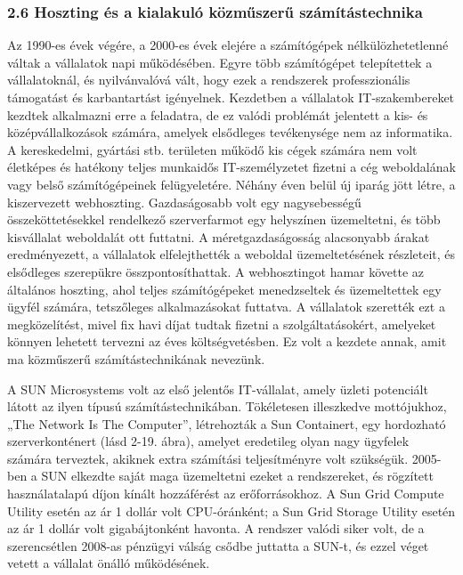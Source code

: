 \documentclass[
]{article}
\begin{document}
\hypertarget{hoszting-uxe9s-a-kialakuluxf3-kuxf6zmux171szerux171-szuxe1muxedtuxe1stechnika}{%
\subsubsection{2.6 Hoszting és a kialakuló közműszerű
számítástechnika}\label{hoszting-uxe9s-a-kialakuluxf3-kuxf6zmux171szerux171-szuxe1muxedtuxe1stechnika}}

Az 1990-es évek végére, a 2000-es évek elejére a számítógépek
nélkülözhetetlenné váltak a vállalatok napi működésében. Egyre több
számítógépet telepítettek a vállalatoknál, és nyilvánvalóvá vált, hogy
ezek a rendszerek professzionális támogatást és karbantartást
igényelnek. Kezdetben a vállalatok IT-szakembereket kezdtek alkalmazni
erre a feladatra, de ez valódi problémát jelentett a kis- és
középvállalkozások számára, amelyek elsődleges tevékenysége nem az
informatika. A kereskedelmi, gyártási stb. területen működő kis cégek
számára nem volt életképes és hatékony teljes munkaidős IT-személyzetet
fizetni a cég weboldalának vagy belső számítógépeinek felügyeletére.
Néhány éven belül új iparág jött létre, a kiszervezett webhoszting.
Gazdaságosabb volt egy nagysebességű összeköttetésekkel rendelkező
szerverfarmot egy helyszínen üzemeltetni, és több kisvállalat weboldalát
ott futtatni. A méretgazdaságosság alacsonyabb árakat eredményezett, a
vállalatok elfelejthették a weboldal üzemeltetésének részleteit, és
elsődleges szerepükre összpontosíthattak. A webhosztingot hamar követte
az általános hoszting, ahol teljes számítógépeket menedzseltek és
üzemeltettek egy ügyfél számára, tetszőleges alkalmazásokat futtatva. A
vállalatok szerették ezt a megközelítést, mivel fix havi díjat tudtak
fizetni a szolgáltatásokért, amelyeket könnyen lehetett tervezni az éves
költségvetésben. Ez volt a kezdete annak, amit ma közműszerű
számítástechnikának nevezünk.

A SUN Microsystems volt az első jelentős IT-vállalat, amely üzleti
potenciált látott az ilyen típusú számítástechnikában. Tökéletesen
illeszkedve mottójukhoz, „The Network Is The Computer'', létrehozták a
Sun Containert, egy hordozható szerverkonténert (lásd 2-19. ábra),
amelyet eredetileg olyan nagy ügyfelek számára terveztek, akiknek extra
számítási teljesítményre volt szükségük. 2005-ben a SUN elkezdte saját
maga üzemeltetni ezeket a rendszereket, és rögzített használatalapú
díjon kínált hozzáférést az erőforrásokhoz. A Sun Grid Compute Utility
esetén az ár 1 dollár volt CPU-óránként; a Sun Grid Storage Utility
esetén az ár 1 dollár volt gigabájtonként havonta. A rendszer valódi
siker volt, de a szerencsétlen 2008-as pénzügyi válság csődbe juttatta a
SUN-t, és ezzel véget vetett a vállalat önálló működésének.
\end{document}
